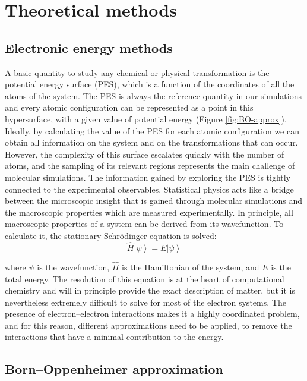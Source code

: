 \section{Theoretical methods}
\subsection*{Electronic energy methods}
A basic quantity to study any chemical or physical transformation is the potential energy surface (PES), which is a function of the coordinates of all the atoms of the system. The PES is always the reference quantity in our simulations and every atomic configuration can be represented as a point in this hypersurface, with a given value of potential energy (Figure \ref{fig:BO-approx}).
Ideally, by calculating the value of the PES for each atomic configuration we can obtain all information on the system and on the transformations that can occur. However, the complexity of this surface escalates quickly with the number of atoms, and the sampling of its relevant regions represents the main challenge of molecular simulations. The information gained by exploring the PES is tightly connected to the experimental observables. Statistical physics acts like a bridge between the microscopic insight that is gained through molecular simulations and the macroscopic properties which are measured experimentally. In principle, all macroscopic properties of a system can be derived from its wavefunction. To calculate it, the stationary Schr\"{o}dinger equation is solved: 
\[
\hat{H}\left\vert\psi\right\rangle = E\left\vert\psi\right\rangle
\]

where $\psi$ is the wavefunction, $\hat{H}$ is the Hamiltonian of the system, and $E$ is the total energy. The resolution of this equation is at the heart of computational chemistry and will in principle provide the exact description of matter, but it is nevertheless extremely difficult to solve for most of the electron systems. The presence of electron--electron interactions makes it a highly coordinated problem, and for this reason, different approximations need to be applied, to remove the interactions that have a minimal contribution to the energy.

\subsection*{Born--Oppenheimer approximation}

